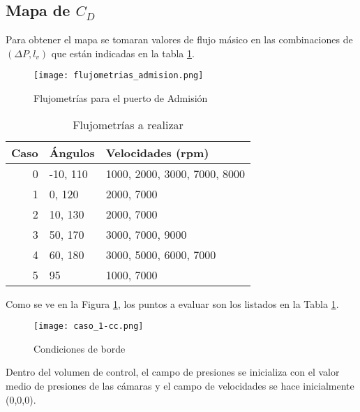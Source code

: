 \subsection{Mapa de $C_D$}
%
Para obtener el mapa se tomaran valores de flujo másico en las combinaciones de
$(\Delta P, l_v)$ que están indicadas en la tabla \ref{tab:casos}.
%
%

\begin{figure}
    \centering
    \texttt{[image: flujometrias\_admision.png]}
    \caption{Flujometrías para el puerto de Admisión}
    \label{fig:flujometrias}
\end{figure}

\begin{table}
    \centering
    \begin{tabular}{rll} \toprule
        Caso & Ángulos  & Velocidades (rpm) \\ \midrule
        0    & -10, 110 & 1000, 2000, 3000, 7000, 8000 \\
        1    & 0, 120   & 2000, 7000 \\
        2    & 10, 130  & 2000, 7000 \\
        3    & 50, 170  & 3000, 7000, 9000 \\
        4    & 60, 180  & 3000, 5000, 6000, 7000 \\
        5    & 95       & 1000, 7000\\ \bottomrule
    \end{tabular}
    \caption{Flujometrías a realizar}
    \label{tab:casos}
\end{table}

Como se ve en la Figura \ref{fig:flujometrias}, los puntos a evaluar son los
listados en la Tabla \ref{tab:casos}.



\begin{figure}[h]
    \texttt{[image: caso\_1-cc.png]}
    \caption{Condiciones de borde}
    \label{fig:geom}
\end{figure}

Dentro del volumen de control, el campo de presiones se inicializa con el valor
medio de presiones de las cámaras y el campo de velocidades se hace
inicialmente (0,0,0).

